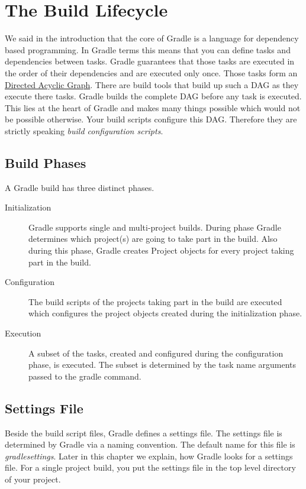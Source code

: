 \chapter{The Build Lifecycle} %
\label{cha:the_build_lifecycle}
We said in the introduction that the core of Gradle is a language for dependency based programming. In Gradle terms this means that you can define tasks and dependencies between tasks. Gradle guarantees that those tasks are executed in the order of their dependencies and are executed only once. Those tasks form an \href{http://en.wikipedia.org/wiki/Directed_acyclic_graph}{Directed Acyclic Graph}. There are build tools that build up such a DAG as they execute there tasks. Gradle builds the complete DAG before any task is executed. This lies at the heart of Gradle and makes many things possible which would not be possible otherwise. Your build scripts configure this DAG. Therefore they are strictly speaking \emph{build configuration scripts}.    

\section{Build Phases} %
\label{sec:build_phases}

A Gradle build has three distinct phases.
\begin{description}
	\item[Initialization] Gradle supports single and multi-project builds. During phase Gradle determines which project(s) are going to take part in the build. Also during this phase, Gradle creates Project objects for every project taking part in the build. 
	\item[Configuration] The build scripts of the projects taking part in the build are executed which configures the project objects created during the initialization phase.
	\item[Execution] A subset of the tasks, created and configured during the configuration phase, is executed. The subset is determined by the task name arguments passed to the gradle command.
\end{description}

\section{Settings File} %
\label{sec:settings_file}
Beside the build script files, Gradle defines a settings file. The settings file is determined by Gradle via a naming convention. The default name for this file is \emph{gradlesettings}. Later in this chapter we explain, how Gradle looks for a settings file. For a single project build, you put the settings file in the top level directory of your project.

